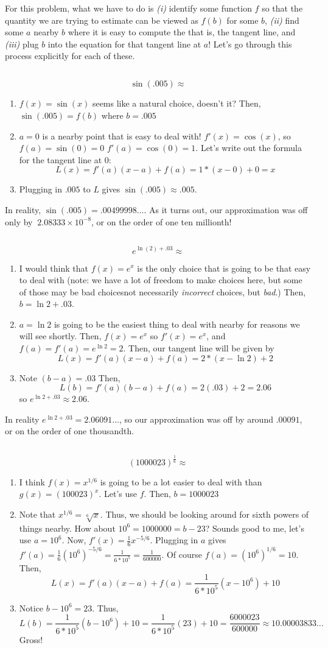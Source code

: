 \documentclass[english]{article}
\newcommand{\prt}[1]{\setcounter{subsection}{#1-1}\subsection{}}
\theoremstyle{remark}
\theoremstyle{definition}
\begin{document}
For this problem, what we have to do is \emph{(i)} identify some function $f$ so that the quantity we are trying to estimate can be viewed as $f(b)$ for some $b$, \emph{(ii)} find some $a$ nearby $b$ where it is easy to compute the  that is, the tangent line, and \emph{(iii)} plug $b$ into the equation for that tangent line at $a$! Let's go through this process explicitly for each of these. 
\prt{1}
$$\sin(.005)\approx$$
\begin{enumerate}[label=\emph{(\roman*)}]
	\item $f(x)=\sin(x)$ seems like a natural choice, doesn't it? Then, $\sin(.005)=f(b)$ where $b=.005$
	\item $a=0$ is a nearby point that is easy to deal with! $f'(x)=\cos(x)$, so $f(a)=\sin(0)=0$ $f'(a)=\cos(0)=1$. Let's write out the formula for the tangent line at 0:
	$$L(x)=f'(a)(x-a)+f(a)=1*(x-0)+0=x$$
	\item  Plugging in $.005$ to $L$ gives $\sin(.005)\approx .005$.
\end{enumerate}
In reality, $\sin(.005)=.00499998\hdots$. As it turns out, our approximation was off only by $~2.08333\times 10^{-8}$, or on the order of one ten millionth!
\prt{2}$$e^{\ln(2)+.03}\approx$$
\begin{enumerate}[label=\emph{(\roman*)}]
	\item I would think that $f(x)=e^x$ is the only choice that is going to be that easy to deal with (note: we have a lot of freedom to make choices here, but some of those may be bad choices\textemdash not necessarily \emph{incorrect} choices, but \emph{bad}.) Then, $b=\ln 2+.03$.
	\item $a=\ln 2$ is going to be the easiest thing to deal with nearby for reasons we will see shortly. Then, $f(x)=e^x$ so $f'(x)=e^x$, and $f(a)=f'(a)=e^{\ln 2}=2$. Then, our tangent line will be given by $$L(x)=f'(a)(x-a)+f(a)=2*(x-\ln 2)+2$$
	\item Note $(b-a)=.03$ Then, $$L(b)=f'(a)(b-a)+f(a)=2(.03)+2=2.06$$ so $e^{\ln 2+.03}\approx 2.06$. 
	\end{enumerate}
In reality $e^{\ln 2+.03}=2.06091\hdots$, so our approximation was off by around $.00091$, or on the order of one thousandth.
\prt{3} $$(1000023)^{\frac{1}{6}}\approx$$
\begin{enumerate}[label=\emph{(\roman*)}]
	\item I think $f(x)=x^{1/6}$ is going to be a lot easier to deal with than $g(x)=(100023)^{x}$. Let's use $f$. Then, $b=1000023$
	\item Note that $x^{1/6}=\sqrt[6]{x}$. Thus, we should be looking around for sixth powers of things nearby. How about $10^6=1000000=b-23$? Sounds good to me, let's use $a=10^6$. Now, $f'(x)=\frac{1}{6}x^{-5/6}$. Plugging in $a$ gives $f'(a)=\frac{1}{6}(10^6)^{-5/6}=\frac{1}{6*10^5}=\frac{1}{600000}$.
	Of course $f(a)=(10^6)^{1/6}=10$. Then, $$L(x)=f'(a)(x-a)+f(a)=\frac{1}{6*10^5}(x-10^6)+10$$
	\item Notice $b-10^6=23$. Thus, $$L(b)=\frac{1}{6*10^5}(b-10^6)+10=\frac{1}{6*10^5}(23)+10=\frac{6000023}{600000}\approx10.00003833\hdots$$
	Gross!
\end{enumerate}
\end{document}

